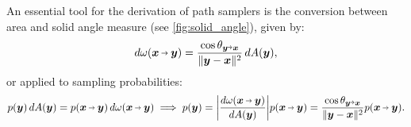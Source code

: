 An essential tool for the derivation of path samplers is the conversion between area and solid angle measure (see \cref{fig:solid_angle}), given by:
\begin{equation}
\label{eq:area_solid_angle}
    \diff \omega(\vec{x}\pto\vec{y}) = \frac{\cos \theta_{\vec{y}\veryshortarrow\vec{x}}}{\|\vec{y} - \vec{x}\|^2} \diff A(\vec{y}),
\end{equation}
or applied to sampling probabilities:
\begin{equation}
\label{eq:area_solid_angle_p}
    p(\vec{y}) \diff A(\vec{y}) = p(\vec{x}\pto\vec{y}) \diff \omega(\vec{x}\pto\vec{y}) \implies
    p(\vec{y})
    = \left| \frac{\diff \omega(\vec{x}\pto\vec{y})}{\diff A(\vec{y})}\right| p(\vec{x}\pto\vec{y})
    = \frac{\cos \theta_{\vec{y}\veryshortarrow\vec{x}}}{\|\vec{y} - \vec{x}\|^2} p(\vec{x}\pto\vec{y}).
\end{equation}

